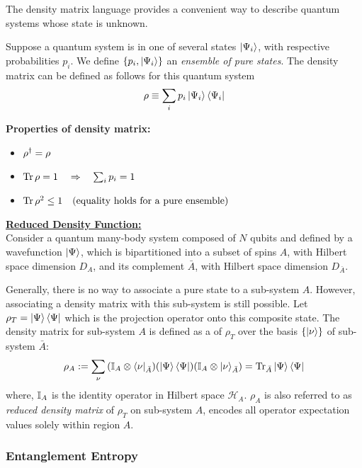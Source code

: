 \documentclass[11pt, oneside]{scrbook}
\renewcommand{\H}{\mathcal{H}}
\begin{document}
The density matrix language provides a convenient way to describe quantum systems whose state is unknown.
\begin{definition}
    Suppose a quantum system is in one of several states \(\ket{\Psi_i}\), with respective probabilities \(p_i\). We define \(\qty{p_i, \ket{\Psi_i}}\) an \emph{ensemble of pure states}. The density matrix can be defined as follows for this quantum system
    \[
        \rho \equiv \sum_{i} p_i \ket{\Psi_i} \bra{\Psi_i}
    \]
\end{definition}
{\bfseries Properties of density matrix:}
\begin{itemize}[noitemsep]
    \item \(\rho^\dagger = \rho\)
    \item \(\Tr\rho = 1 \quad \Rightarrow \quad \sum_{i} p_i = 1\)
    \item \(\Tr \rho^2 \le 1 \quad (\text{equality holds for a pure ensemble})\)
\end{itemize}
{\bfseries \uline{Reduced Density Function:}}\\
Consider a quantum many-body system composed of \(N\) qubits and defined by a wavefunction \(\ket{\Psi}\), which is bipartitioned into a subset of spins \(A\), with Hilbert space dimension \(D_{A}\), and its complement \(\bar{A}\), with Hilbert space dimension \(D_{\bar{A}}\).

Generally, there is no way to associate a pure state to a sub-system $A$. However, associating a density matrix with this sub-system is still possible. Let \(\rho_{T} = \ket{\Psi} \bra{\Psi}\) which is the projection operator onto this composite state. The density matrix for sub-system \(A\) is defined as a  of \(\rho_T\) over the basis \(\qty{\ket{\nu}}\) of sub-system \(\bar{A}\):
\begin{equation}
    \rho_A := \sum_{\nu} \qty(\mathbb{I}_{A} \otimes \bra{\nu}_{\bar{A}}) \qty(\ket{\Psi} \bra{\Psi}) \qty(\mathbb{I}_{A} \otimes \ket{\nu}_{\bar{A}}) = \Tr_{\bar{A}} \ket{\Psi} \bra{\Psi}
\end{equation}
where, \(\mathbb{I}_{A}\) is the identity operator in Hilbert space \(\H_A\). \(\rho_A\) is also referred to as \emph{reduced density matrix} of \(\rho_T\) on sub-system \(A\), encodes all operator expectation values solely within region $A$.

\subsubsection{Entanglement Entropy}
\end{document}
